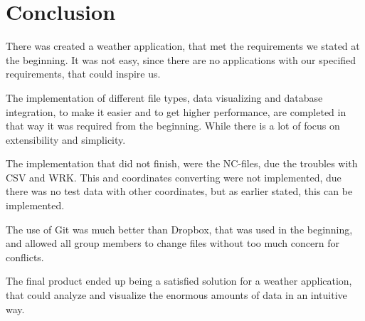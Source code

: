 \chapter{Conclusion}
There was created a weather application, that met the requirements we stated at the beginning.
It was not easy, since there are no applications with our specified requirements, that could inspire us.

The implementation of different file types, data visualizing and database integration, to make it easier and to get higher performance, are completed in that way it was required from the beginning. While there is a lot of focus on extensibility and simplicity.
 
The implementation that did not finish, were the NC-files, due the troubles with CSV and WRK. This and coordinates converting were not implemented, due there was no test data with other coordinates, but as earlier stated, this can be implemented.

The use of Git was much better than Dropbox, that was used in the beginning, and allowed all group members to change files without too much concern for conflicts.

The final product ended up being a satisfied solution for a weather application, that could analyze and visualize the enormous amounts of data in an intuitive way.